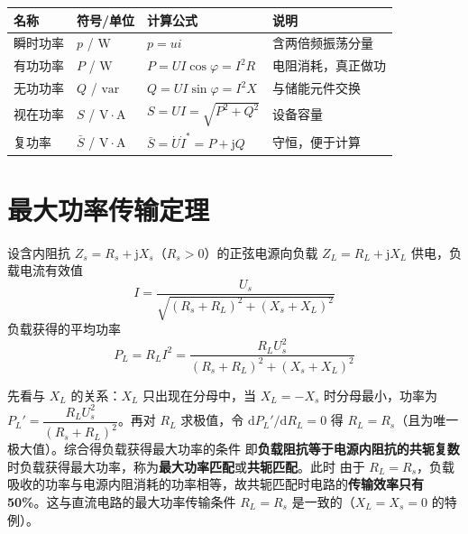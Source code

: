 \begin{center}
\begin{tabular}{@{}llll@{}}
\toprule
名称 & 符号/单位 & 计算公式 & 说明 \\
\midrule
瞬时功率 & $p$ / $\mathrm{W}$ & $p=ui$ & 含两倍频振荡分量 \\
有功功率 & $P$ / $\mathrm{W}$ & $P=UI\cos\varphi=I^2R$ & 电阻消耗，真正做功 \\
无功功率 & $Q$ / $\mathrm{var}$ & $Q=UI\sin\varphi=I^2X$ & 与储能元件交换 \\
视在功率 & $S$ / $\mathrm{V\cdot A}$ & $S=UI=\sqrt{P^2+Q^2}$ & 设备容量 \\
复功率 & $\bar{S}$ / $\mathrm{V\cdot A}$ & $\bar{S}=\dot{U}\dot{I}^{*}=P+\mathrm{j}Q$ & 守恒，便于计算 \\
\bottomrule
\end{tabular}
\end{center}


\section{最大功率传输定理}
设含内阻抗 $Z_s=R_s+\mathrm{j}X_s$（$R_s>0$）的正弦电源向负载 $Z_L=R_L+\mathrm{j}X_L$ 供电，负载电流有效值
\begin{equation}
I=\frac{U_s}{\sqrt{\left(R_s+R_L\right)^2+\left(X_s+X_L\right)^2}}
\end{equation}
负载获得的平均功率
\begin{equation}
P_L=R_LI^2=\frac{R_LU_s^2}{\left(R_s+R_L\right)^2+\left(X_s+X_L\right)^2}
\end{equation}

先看与 $X_L$ 的关系：$X_L$ 只出现在分母中，当 $X_L=-X_s$ 时分母最小，功率为 $P_L'=\dfrac{R_LU_s^2}{\left(R_s+R_L\right)^2}$。再对 $R_L$ 求极值，令 $\mathrm{d}P_L'/\mathrm{d}R_L=0$ 得 $R_L=R_s$（且为唯一极大值）。综合得负载获得最大功率的条件
即\textbf{负载阻抗等于电源内阻抗的共轭复数}时负载获得最大功率，称为\textbf{最大功率匹配}或\textbf{共轭匹配}。此时
由于 $R_L=R_s$，负载吸收的功率与电源内阻消耗的功率相等，故共轭匹配时电路的\textbf{传输效率只有 50\%}。这与直流电路的最大功率传输条件 $R_L=R_s$ 是一致的（$X_L=X_s=0$ 的特例）。

